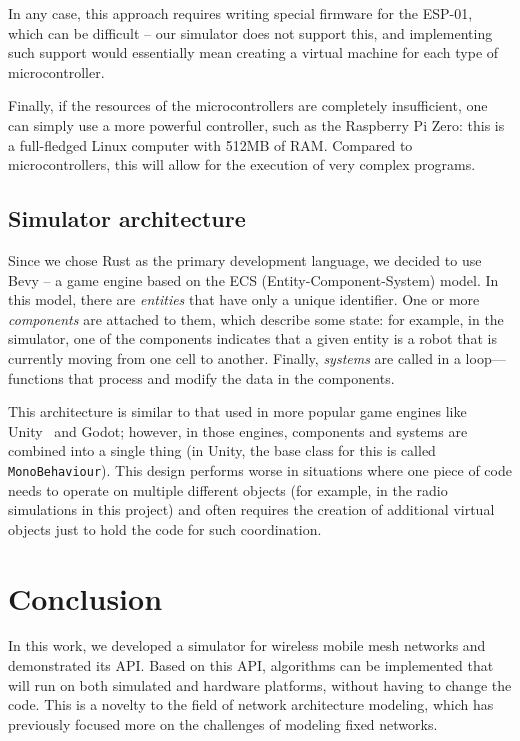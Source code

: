 \documentclass[%
]{article}
\begin{document}
In any case, this approach requires writing special firmware for the ESP-01,
which can be difficult -- our simulator does not support this,
and implementing such support would essentially mean creating a virtual machine for each type of microcontroller.

Finally, if the resources of the microcontrollers are completely insufficient,
one can simply use a more powerful controller,
such as the Raspberry Pi Zero: this is a full-fledged Linux computer with 512MB of RAM.
Compared to microcontrollers, this will allow for the execution of very complex programs.


\subsection{Simulator architecture}

Since we chose Rust as the primary development language,
we decided to use Bevy -- a game engine based on the ECS (Entity-Component-System) model.
In this model, there are \emph{entities} that have only a unique identifier.
One or more \emph{components} are attached to them, which describe some state:
for example, in the simulator, one of the components indicates that a given entity is a robot that is currently moving from one cell to another.
Finally, \emph{systems} are called in a loop—functions that process and modify the data in the components.

This architecture is similar to that used in more popular game engines
like Unity~\cite{unity} and Godot; however, in those engines, components
and systems are combined into a single thing
(in Unity, the base class for this is called \texttt{MonoBehaviour}).
This design performs worse in situations where one piece of code needs
to operate on multiple different objects
(for example, in the radio simulations in this project)
and often requires the creation of additional virtual objects just to hold the code for such coordination.


\section{Conclusion}

In this work, we developed a simulator for wireless mobile mesh networks and demonstrated its API.
Based on this API, algorithms can be implemented that will run 
on both simulated and hardware platforms,
without having to change the code.
This is a novelty to the field of network architecture modeling,
which has previously focused more on the challenges of modeling fixed networks.
\end{document}
